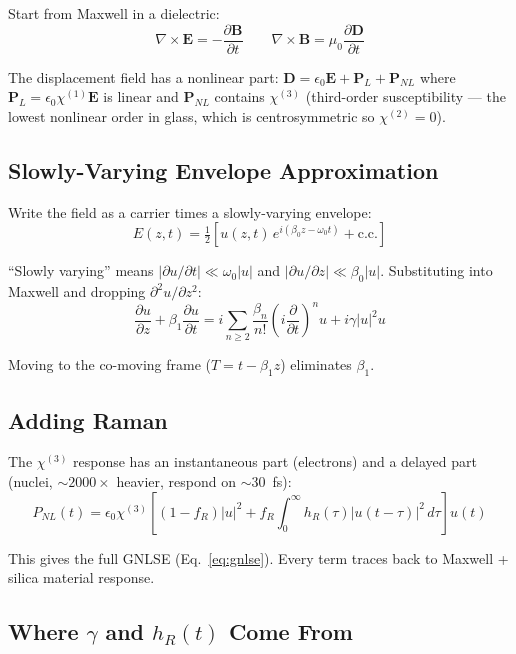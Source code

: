\documentclass[12pt,a4paper]{article}
\newcommand{\pdv}[2]{\frac{\partial #1}{\partial #2}}
\begin{document}
Start from Maxwell in a dielectric:
\begin{equation}
\nabla\times\mathbf{E} = -\pdv{\mathbf{B}}{t} \qquad \nabla\times\mathbf{B} = \mu_0\pdv{\mathbf{D}}{t}
\end{equation}

The displacement field has a nonlinear part:
$\mathbf{D} = \epsilon_0\mathbf{E} + \mathbf{P}_L + \mathbf{P}_{NL}$
where $\mathbf{P}_L = \epsilon_0\chi^{(1)}\mathbf{E}$ is linear and $\mathbf{P}_{NL}$ contains $\chi^{(3)}$ (third-order susceptibility --- the lowest nonlinear order in glass, which is centrosymmetric so $\chi^{(2)} = 0$).

\subsection{Slowly-Varying Envelope Approximation}

Write the field as a carrier times a slowly-varying envelope:
\begin{equation}
E(z,t) = \tfrac{1}{2}\!\left[u(z,t)\,e^{i(\beta_0 z - \omega_0 t)} + \text{c.c.}\right]
\end{equation}

``Slowly varying'' means $|\partial u/\partial t| \ll \omega_0|u|$ and $|\partial u/\partial z| \ll \beta_0|u|$. Substituting into Maxwell and dropping $\partial^2 u/\partial z^2$:
\begin{equation}
\pdv{u}{z} + \beta_1\pdv{u}{t} = i\sum_{n\geq 2}\frac{\beta_n}{n!}\!\left(i\pdv{}{t}\right)^n\!u + i\gamma|u|^2 u
\end{equation}

Moving to the co-moving frame ($T = t - \beta_1 z$) eliminates $\beta_1$.

\subsection{Adding Raman}

The $\chi^{(3)}$ response has an instantaneous part (electrons) and a delayed part (nuclei, ${\sim}2000\times$ heavier, respond on ${\sim}30$~fs):
\begin{equation}
P_{NL}(t) = \epsilon_0\chi^{(3)}\!\left[(1-f_R)|u|^2 + f_R\!\int_0^\infty\!h_R(\tau)|u(t-\tau)|^2\,d\tau\right]u(t)
\end{equation}

This gives the full GNLSE (Eq.~\ref{eq:gnlse}). Every term traces back to Maxwell + silica material response.

\subsection{Where $\gamma$ and $h_R(t)$ Come From}
\end{document}
